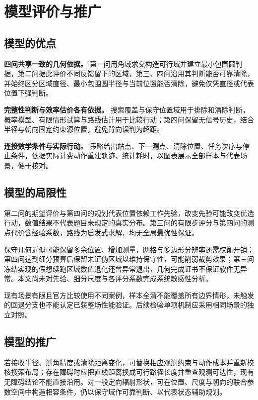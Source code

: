 \documentclass[UTF8,a4paper,zihao=-4,fontset=none]{ctexart}
\begin{document}
\section{模型评价与推广}

\subsection{模型的优点}

\textbf{四问共享一致的几何依据。} 第一问用角域求交构造可行域并建立最小包围圆判据，第二问据此评价不同反馈留下的区域，第三、四问沿用其判断能否可靠清除，并始终区分区域直径、最小包围圆半径与当前位置能否清除，避免仅凭直径或代表位置下强判断。

\textbf{完整性判断与效率估价各有依据。} 搜索覆盖与保守位置域用于排除和清除判断，概率模型、有限情形试算与路线估计用于比较行动；第四问保留无信号历史，结合半径与朝向固定约束源位置，避免背向误判为超距。

\textbf{连接数学条件与实际行动。} 策略给出站点、下一测点、清除位置、任务次序与停止条件，依据实际计费动作重建轨迹、统计耗时，以图表展示全部样本与代表场景，便于核对。

\subsection{模型的局限性}

第二问的期望评价与第四问的规划代表位置依赖工作先验，改变先验可能改变优选行动，数值结果不代表题目未规定的真实分布。第三问的有限步评分与第四问的测点代价含经验系数，路线为启发式求解，均无全局最优性保证。

保守几何近似可能保留多余位置、增加测量，网格与多边形分辨率还需权衡开销；第四问达到细分预算后保留未证伪区域以维持保守性，可能削弱裁剪效果；第三问冻结实现的假想续跑区域数值退化还曾异常退出，几何完成证书不保证软件无异常。本文尚未对先验、细分尺度与各评分系数完成系统敏感性分析。

现有场景有限且官方比较使用不同案例，样本全清不能覆盖所有边界情形，未触发的回退分支也不能认定已获整场性能验证。后续检验单项机制应采用相同场景的独立对照。

\subsection{模型的推广}

若接收半径、测角精度或清除距离变化，可替换相应观测约束与动作成本并重新校核搜索布局；存在障碍时应把直线距离换成可行路径长度并重查观测可达性，现有无障碍结论不能直接沿用。对一般定向辐射形状，可在位置、尺度与朝向的联合参数空间中构造相容条件，仍以保守域作可靠判断、以代表状态辅助规划。
\end{document}
